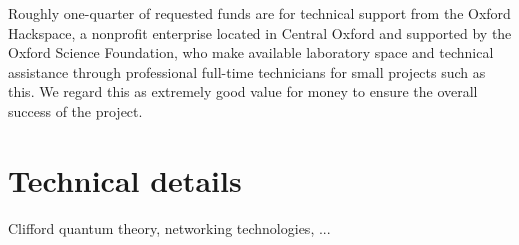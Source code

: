 \documentclass[a4paper, 12pt]{article}
\begin{document}
\vspace{10pt}
\noindent
Roughly one-quarter of requested funds are for technical support from the Oxford Hackspace, a nonprofit enterprise located in Central Oxford and supported by the Oxford Science Foundation, who make available laboratory space and technical assistance through professional full-time technicians for small projects such as this. We regard this as extremely good value for money to ensure the overall success of the project.

\section*{Technical details}

Clifford quantum theory, networking technologies, ...
\end{document}
